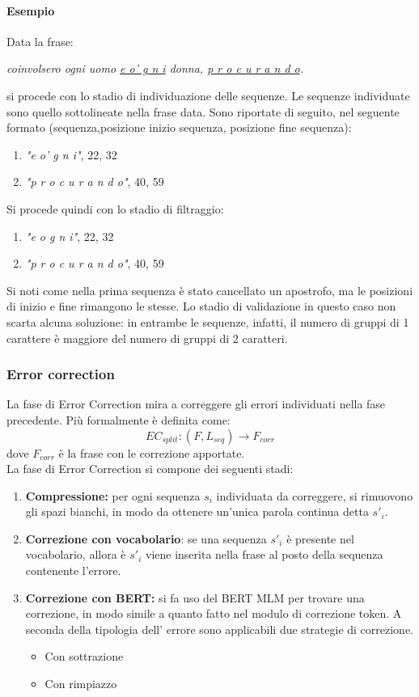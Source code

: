 \paragraph{Esempio}
Data la frase:
\begin{center}
\textit{coinvolsero ogni uomo \ul{e o' g n i} donna, \ul{p r o c u r a n d o}.}
\end{center}
si procede con lo stadio di individuazione delle sequenze. Le sequenze individuate sono quello sottolineate nella frase data. Sono riportate di seguito, nel seguente formato (sequenza,posizione inizio sequenza, posizione fine sequenza):
\begin{enumerate}
\item \textit{"e o' g n i"}, 22, 32
\item \textit{"p r o c u r a n d o"}, 40, 59
\end{enumerate}

Si procede quindi con lo stadio di filtraggio:
\begin{enumerate}
\item \textit{"e o g n i"}, 22, 32
\item \textit{"p r o c u r a n d o"}, 40, 59
\end{enumerate}
Si noti come nella prima sequenza è stato cancellato un apostrofo, ma le posizioni di inizio e fine rimangono le stesse. Lo stadio di validazione in questo caso non scarta alcuna soluzione: in entrambe le sequenze, infatti, il numero di gruppi di 1 carattere è maggiore del numero di gruppi di 2 caratteri.

\subsubsection{Error correction}
\label{sec:met_split_errcor}
La fase di Error Correction mira a correggere gli errori individuati nella fase precedente. Più formalmente è definita come:
\begin{equation}
EC_{split}: (F,L_{seq}) \rightarrow F_{corr}
\end{equation}
dove $F_{corr}$ è la frase con le correzione apportate.\\
La fase di Error Correction si compone dei seguenti stadi:
\begin{enumerate}
\item \textbf{Compressione:} per ogni sequenza $s_i$ individuata da correggere, si rimuovono gli spazi bianchi, in modo da ottenere un'unica parola continua detta $s\prime_i$.
\item \textbf{Correzione con vocabolario}: se una sequenza $s\prime_i$ è presente nel vocabolario, allora è $s\prime_i$ viene inserita nella frase al posto della sequenza contenente l'errore.
\item \textbf{Correzione con BERT:} si fa uso del BERT MLM per trovare una correzione, in modo simile a quanto fatto nel modulo di correzione token. A seconda della tipologia dell' errore sono applicabili due strategie di correzione.
		\begin{itemize}
		\item Con sottrazione		
		\item Con rimpiazzo		
		\end{itemize}
\end{enumerate}

